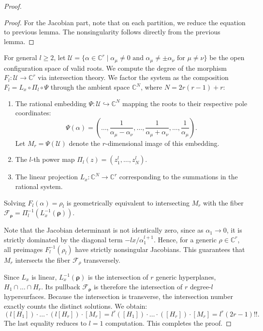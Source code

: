 \documentclass[11pt]{amsart}
\theoremstyle{remark}
\numberwithin{equation}{section}
\begin{document}
\begin{proof}
\begin{proof}
For the Jacobian part, note that on each partition, we reduce the equation to previous lemma. The nonsingularity follows directly from the previous lemma.
\end{proof}

For general $l \geq 2$, let $\mathcal{U} = \{ \alpha \in \mathbb{C}^r \mid \alpha_\mu \neq 0 \text{ and } \alpha_\mu \neq \pm \alpha_\nu \text{ for } \mu \neq \nu \}$ be the open configuration space of valid roots. We compute the degree of the morphism $F_l: \mathcal{U} \to \mathbb{C}^r$ via intersection theory. We factor the system as the composition $F_l = L_x \circ \Pi_l \circ \Psi$ through the ambient space $\mathbb{C}^N$, where $N = 2r(r-1) + r$: 
\begin{enumerate}
    \item The rational embedding $\Psi: \mathcal{U} \hookrightarrow \mathbb{C}^N$ mapping the roots to their respective pole coordinates:
    \[
        \Psi(\alpha) = \left( \dots, \frac{1}{\alpha_\mu - \alpha_\nu}, \dots, \frac{1}{\alpha_\mu + \alpha_\nu}, \dots, \frac{1}{\alpha_\mu} \right).
    \]
    Let $M_r = \Psi(\mathcal{U})$ denote the $r$-dimensional image of this embedding.
    \item The $l$-th power map $\Pi_l(z) = (z_1^l, \dots, z_N^l)$.
    \item The linear projection $L_x: \mathbb{C}^N \to \mathbb{C}^r$ corresponding to the summations in the rational system.
\end{enumerate}

Solving $F_l(\alpha) = \rho_l$ is geometrically equivalent to intersecting $M_r$ with the fiber $\mathcal{F}_{\boldsymbol{\rho}} = \Pi_l^{-1}(L_x^{-1}(\boldsymbol{\rho}))$.

Note that the Jacobian determinant is not identically zero, since as $\alpha_1 \rightarrow 0$, it is strictly dominated by the diagonal term $-lx/ \alpha_1^{l+1}$. Hence, for a generic $\rho \in \mathbb{C}^r$, all preimages $F_l^{-1}(\rho_l)$ have strictly nonsingular Jacobians. This guarantees that $M_r$ intersects the fiber $\mathcal{F}_\rho$ transversely.

Since $L_x$ is linear, $L_x^{-1}(\boldsymbol{\rho})$ is the intersection of $r$ generic hyperplanes, $H_1 \cap \dots \cap H_r$. Its pullback $\mathcal{F}_{\boldsymbol{\rho}}$ is therefore the intersection of $r$ degree-$l$ hypersurfaces. 
Because the intersection is transverse, the intersection number exactly counts the distinct solutions. We obtain:
\[
    (l[H_1]) \cdot \dots \cdot (l[H_r]) \cdot [M_r] = l^r ([H_1]) \cdot \dots \cdot ([H_r]) \cdot [M_r]  = l^r (2r-1)!!.
\]
The last equality reduces to $l=1$ computation. This completes the proof.
\end{proof}
\end{document}
